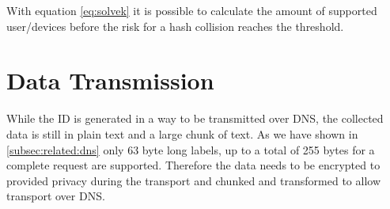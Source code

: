         With equation \ref{eq:solvek} it is possible to calculate the amount of supported user/devices before the risk for a hash collision reaches the threshold.
\newpage



\section{Data Transmission}
\label{sec:software_design:tx}
%
    While the ID is generated in a way to be transmitted over DNS, the collected data is still in plain text and a large chunk of text. As we have shown in \ref{subsec:related:dns} only 63 byte long labels, up to a total of 255 bytes for a complete request are supported.
    Therefore the data needs to be encrypted to provided privacy during the transport and chunked and transformed to allow transport over DNS.\\
